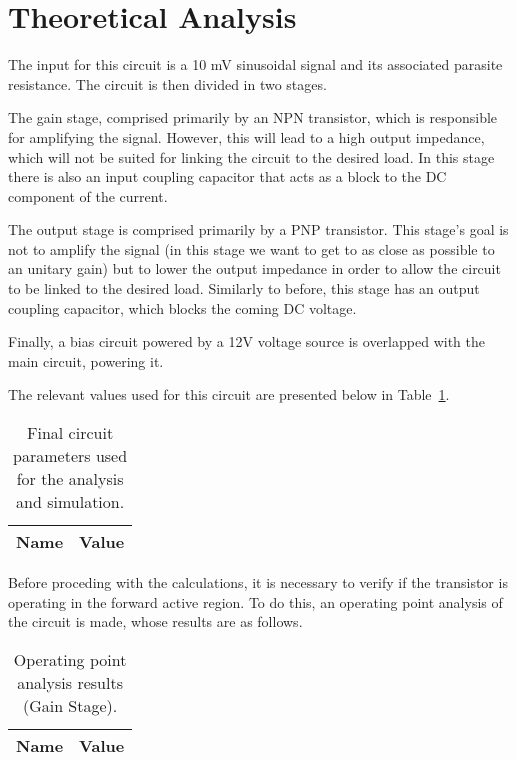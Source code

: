 \section{Theoretical Analysis}
\label{sec:analysis}

The input for this circuit is a 10 mV sinusoidal signal and its associated parasite resistance. The circuit is then divided in two stages.

The gain stage, comprised primarily by an NPN transistor, which is responsible for amplifying the signal. However, this will lead to a high output impedance, which will not be suited for linking the circuit to the desired load. In this stage there is also an input coupling capacitor that acts as a block to the DC component of the current.

The output stage is comprised primarily by a PNP transistor. This stage's goal is not to amplify the signal (in this stage we want to get to as close as possible to an unitary gain) but to lower the output impedance in order to allow the circuit to be linked to the desired load. Similarly to before, this stage has an output coupling capacitor, which blocks the coming DC voltage.

Finally, a bias circuit powered by a 12V voltage source is overlapped with the main circuit, powering it.

The relevant values used for this circuit are presented below in Table~\ref{tab:data}.

\begin{table}[h]
  \centering
  \begin{tabular}{|l|r|}
    \hline    
    {\bf Name} & {\bf Value} \\ \hline
    
  \end{tabular}
  \caption{Final circuit parameters used for the analysis and simulation.}
  \label{tab:data}
\end{table}



Before proceding with the calculations, it is necessary to verify if the transistor is operating in the forward active region. To do this, an operating point analysis of the circuit is made, whose results are as follows.

\begin{table}[h]
  \centering
  \begin{tabular}{|l|r|}
    \hline    
    {\bf Name} & {\bf Value} \\ \hline
    
  \end{tabular}
	\caption{Operating point analysis results (Gain Stage).}
  \label{tab:conf}
\end{table}


